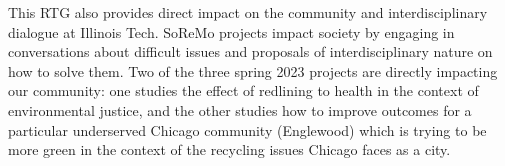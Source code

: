 \documentclass[11pt]{NSFamsart}
\begin{document}
This RTG also provides direct impact  on the community and interdisciplinary dialogue at Illinois Tech. 
SoReMo projects impact society by engaging in conversations about difficult issues and proposals of interdisciplinary nature on how to solve them. 
Two of the three spring 2023 projects are directly impacting our community: one studies the effect of redlining to health in the context of environmental justice, and the other studies how to improve outcomes for a particular underserved Chicago community (Englewood) which is trying to be more green in the context of the recycling issues Chicago faces as a city.  %
 
\end{document}
